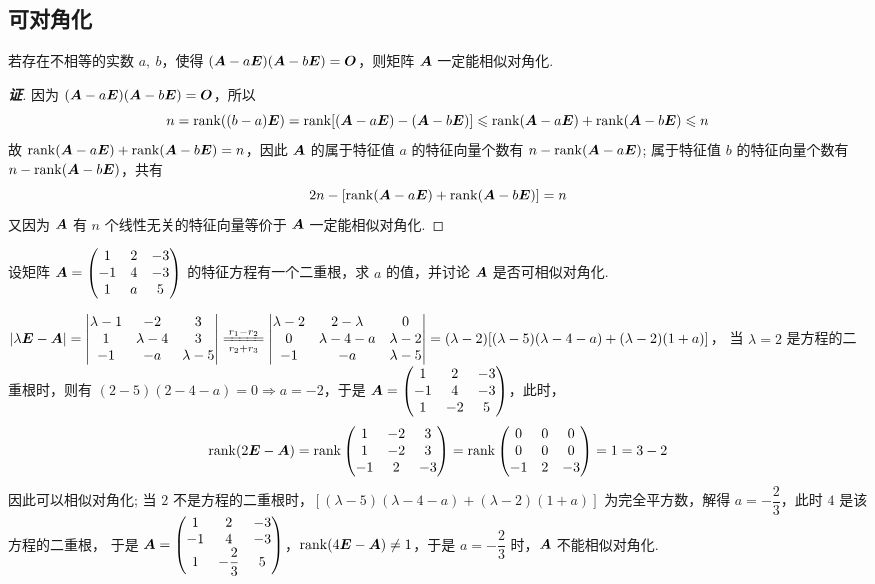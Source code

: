 \subsection{可对角化}

\begin{theorem}
    若存在不相等的实数 $a,~b$，使得 $(\vb*{A}-a\vb*{E})(\vb*{A}-b\vb*{E})=\vb*{O}$，则矩阵 $\vb*{A}$ 一定能相似对角化.
\end{theorem}
\begin{proof}[{\songti \textbf{证}}]
    因为 $(\vb*{A}-a\vb*{E})(\vb*{A}-b\vb*{E})=\vb*{O}$，所以 $$n=\rank((b-a)\vb*{E})=\rank[(\vb*{A}-a\vb*{E})-(\vb*{A}-b\vb*{E})]\leqslant \rank(\vb*{A}-a\vb*{E})+\rank(\vb*{A}-b\vb*{E})\leqslant n$$
    故 $\rank(\vb*{A}-a\vb*{E})+\rank(\vb*{A}-b\vb*{E})=n$，因此 $\vb*{A}$ 的属于特征值 $a$ 的特征向量个数有 $n-\rank(\vb*{A}-a\vb*{E})$; 属于特征值 $b$ 的特征向量个数有 $n-\rank(\vb*{A}-b\vb*{E})$，共有
    $$2n-\qty[\rank(\vb*{A}-a\vb*{E})+\rank(\vb*{A}-b\vb*{E})]=n$$
    又因为 $\vb*{A}$ 有 $n$ 个线性无关的特征向量等价于 $\vb*{A}$ 一定能相似对角化.
\end{proof}


\begin{example}[2004 数一]
    设矩阵 $\vb*{A}=\mqty(1&2&-3\\-1&4&-3\\1&a&5)$ 的特征方程有一个二重根，求 $a$ 的值，并讨论 $\vb*{A}$ 是否可相似对角化.
\end{example}
\begin{solution}
    $|\lambda\vb*{E}-\vb*{A}|=\mqty|\lambda-1&-2&3\\1&\lambda-4&3\\-1&-a&\lambda-5|\xlongequal[r_2+r_3]{r_1-r_2}\mqty|\lambda-2&2-\lambda&0\\0&\lambda-4-a&\lambda-2\\-1&-a&\lambda-5|=(\lambda-2)\qty[(\lambda-5)(\lambda-4-a)+(\lambda-2)(1+a)]$，
    当 $\lambda=2$ 是方程的二重根时，则有 $(2-5)(2-4-a)=0\Rightarrow a=-2$，于是 $\vb*{A}=\mqty(1&2&-3\\-1&4&-3\\1&-2&5)$，此时，
    $$\rank(2\vb*{E}-\vb*{A})=\rank\mqty(1&-2&3\\1&-2&3\\-1&2&-3)=\rank\mqty(0&0&0\\0&0&0\\-1&2&-3)=1=3-2$$
    因此可以相似对角化; 当 $2$ 不是方程的二重根时，$[(\lambda-5)(\lambda-4-a)+(\lambda-2)(1+a)]$ 为完全平方数，解得 $a=-\dfrac{2}{3}$，此时 $4$ 是该方程的二重根，
    于是 $\vb*{A}=\mqty(1&2&-3\\-1&4&-3\\1&-\dfrac{2}{3}&5)$，$\rank(4\vb*{E}-\vb*{A})\neq 1$，于是 $a=-\dfrac{2}{3}$ 时，$\vb*{A}$ 不能相似对角化.
\end{solution}

